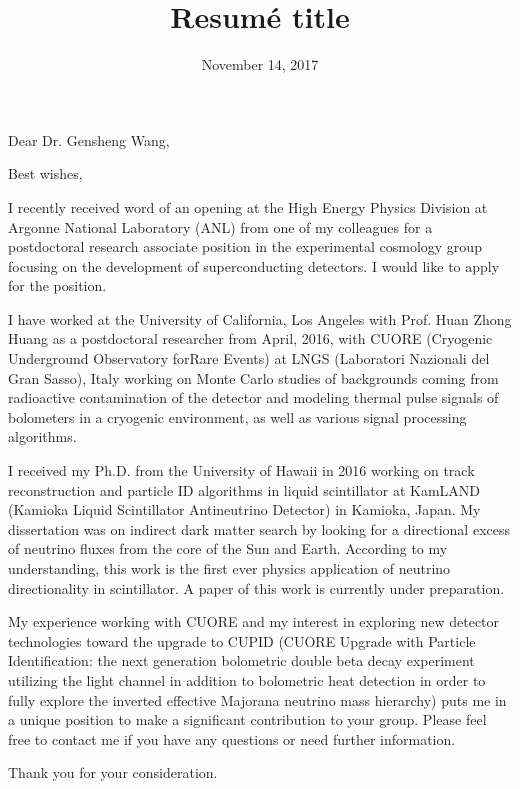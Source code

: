 \documentclass[11pt,a4paper,sans]{moderncv}        %
\title{Resumé title}                               %
\begin{document}
\date{November 14, 2017}
\opening{Dear Dr. Gensheng Wang,}
\closing{Best wishes,}
\makelettertitle

I recently received word of an opening at the High Energy Physics Division at
Argonne National Laboratory (ANL) from one of my colleagues for a postdoctoral
research associate position in the experimental cosmology group focusing on the
development of superconducting detectors. I would like to apply for the
position.

I have worked at the University of California, Los Angeles with Prof. Huan
Zhong Huang as a postdoctoral researcher from April, 2016, with CUORE
(Cryogenic Underground Observatory forRare Events) at LNGS (Laboratori
Nazionali del Gran Sasso), Italy working on Monte Carlo studies of backgrounds
coming from radioactive contamination of the detector and modeling thermal
pulse signals of bolometers in a cryogenic environment, as well as various
signal processing algorithms.

I received my Ph.D. from the University of Hawaii in 2016 working on track
reconstruction and particle ID algorithms in liquid scintillator at KamLAND
(Kamioka Liquid Scintillator Antineutrino Detector) in Kamioka, Japan. My
dissertation was on indirect dark matter search by looking for a directional
excess of neutrino fluxes from the core of the Sun and Earth. According to my
understanding, this work is the first ever physics application of neutrino
directionality in scintillator. A paper of this work is currently under
preparation.

My experience working with CUORE and my interest in exploring new detector
technologies toward the upgrade to CUPID (CUORE Upgrade with Particle
Identification: the next generation bolometric double beta decay experiment
utilizing the light channel in addition to bolometric heat detection in order
to fully explore the inverted effective Majorana neutrino mass hierarchy) puts
me in a unique position to make a significant contribution to your group.
Please feel free to contact me if you have any questions or need further
information.

Thank you for your consideration.

\makeletterclosing
\end{document}
